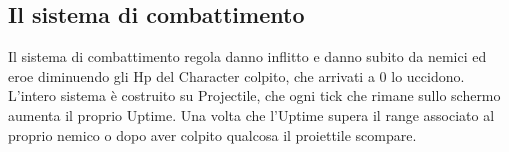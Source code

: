 \documentclass[12pt]{article}
\begin{document}
\subsection{Il sistema di combattimento}
Il sistema di combattimento regola danno inflitto e danno subito da nemici ed eroe diminuendo gli Hp del Character 
colpito, che arrivati a 0 lo uccidono. 
L'intero sistema è costruito su Projectile, che ogni tick che rimane sullo schermo aumenta il proprio Uptime.
Una volta che l'Uptime supera il range associato al proprio nemico o dopo aver colpito qualcosa il proiettile scompare.
\end{document}
